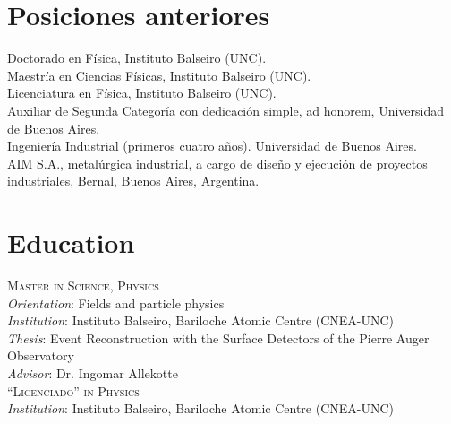 \section*{Posiciones anteriores}
\noindent
{}Doctorado en Física, Instituto Balseiro (UNC).\\
Maestría en Ciencias Físicas, Instituto Balseiro (UNC).\\
Licenciatura en Física, Instituto Balseiro (UNC).\\
Auxiliar de Segunda Categoría con dedicación simple, ad honorem, Universidad de Buenos Aires.\\
Ingeniería Industrial (primeros cuatro años). Universidad de Buenos Aires.\\
AIM S.A., metalúrgica industrial, a cargo de diseño y ejecución de proyectos industriales, Bernal, Buenos Aires, Argentina.\\
\fi


\ifeng
\section*{Education}
\noindent
\textsc{Master in Science, Physics}\\
{\emph{Orientation}}: Fields and particle physics\\
{\emph{Institution}}: Instituto Balseiro, Bariloche Atomic Centre (CNEA-UNC)\\
{\emph{Thesis}}: Event Reconstruction with the Surface Detectors of the Pierre
Auger Observatory\\
{\emph{Advisor}}: Dr. Ingomar Allekotte\\ 
\textsc{``Licenciado'' in Physics}\\
{\emph{Institution}}: Instituto Balseiro, Bariloche Atomic Centre (CNEA-UNC)\\
\else
